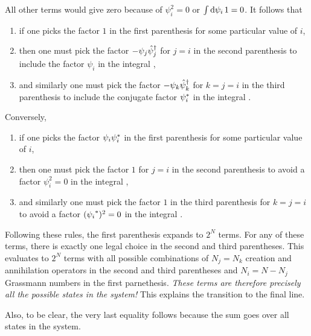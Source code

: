 All other terms would give zero because of $\psi_i^2 = 0$ or $\int \mathop{}\!\mathrm{d} \psi_i \, 1 = 0$.
It follows that
\begin{enumerate}
\item if one picks the factor $1$ in the first parenthesis for some particular value of $i$,
\item then one must pick the factor $-\psi_j \creat_j$ for $j = i$ in the second parenthesis to include the factor $\psi_i$ in the integral ,
\item and similarly one must pick the factor $-\psi_k \hat\psi^\dagger_k$ for $k = j = i$ in the third parenthesis to include the conjugate factor ${\psi}^*_i$ in the integral .
\end{enumerate}
Conversely,
\begin{enumerate}
\item if one picks the factor $\psi_i \conj \psi_i$ in the first parenthesis for some particular value of $i$,
\item then one must pick the factor $1$ for $j = i$ in the second parenthesis to avoid a factor $\psi_i^2 = 0$ in the integral ,
\item and similarly one must pick the factor $1$ in the third parenthesis for $k = j = i$ to avoid a factor $({\psi_i}^*)^2 = 0$ in the integral .
\end{enumerate}
Following these rules, the first parenthesis expands to $2^N$ terms.
For any of these terms, there is exactly one legal choice in the second and third parentheses.
This evaluates to $2^N$ terms with all possible combinations of $N_j = N_k$ creation and annihilation operators in the second and third parentheses and $N_i = N - N_j$ Grassmann numbers in the first parnethesis.
\emph{These terms are therefore precisely all the possible states  in the system!}
This explains the transition to the final line.
\iffalse
\begin{itemize}
\item choose $k = j$ in the third parenthesis in order to pair $\psi_j$ with $\conj\psi_j$, and
\item for every factor $\psi_i \conj\psi_i$ one chooses from the first parenthesis, one must choose the factor $1$ from the second and third parentheses in order to avoid $\psi_i^2=0$, and conversely,
\item for every factor $1$ one chooses from the first parenthesis, one must choose the factor $-\psi_j \creat_j$ and $-\destr_k \conj\psi_k$ from the second and third parentheses in order to not miss a factor $\psi_i \conj\psi_i$ in the product \TODO{ref}.
\end{itemize}
Following these rules is equivalent to iterating over all $2^N$ combinations with $N_j$ creation and destruction operators in the second and third parentheses and $N_i = N - N_j$ Grassmann numbers in the first parenthesis.
\fi
Also, to be clear, the very last equality follows because the sum goes over all states  in the system.

